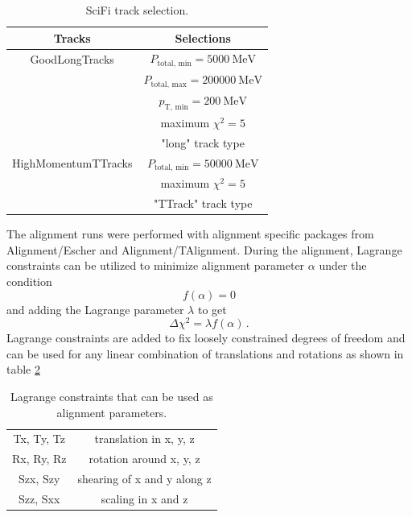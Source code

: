 \begin{table}[!ht]
    \centering
    \begin{tabular}{c|c}
        \toprule
            Tracks & Selections \\
        \midrule
            GoodLongTracks &  $P_{\text{total, min}} = \SI{5000}{\mega\electronvolt}$ \\
            & $P_{\text{total, max}} = \SI{200000}{\mega\electronvolt}$ \\
            & $p_\text{T, min} = \SI{200}{\mega\electronvolt}$ \\
            & maximum $\chi^2 = 5$ \\
            & "long" track type \\
            \hline
            HighMomentumTTracks & $P_{\text{total, min}} = \SI{50000}{\mega\electronvolt}$ \\
            & maximum $\chi^2 = 5$ \\
            & "TTrack" track type \\
        \bottomrule
    \end{tabular}
    \caption{SciFi track selection.}
    \label{tab:tracks}
\end{table}

The alignment runs were performed with alignment specific packages from Alignment/Escher and Alignment/TAlignment\cite{align}.
During the alignment, Lagrange constraints can be utilized to minimize alignment
parameter $\alpha $ under the condition
\begin{equation}
  f(\alpha) = 0
\end{equation}
and adding the Lagrange parameter $\lambda$ to get
\begin{equation}
  \Delta \chi^2 = \lambda f(\alpha)\,.
\end{equation}
Lagrange constraints are added to fix loosely constrained degrees of freedom and can be used for any linear combination of translations and rotations as shown in table \ref{tab:lagr}

\begin{table}[!ht]
    \centering
    \begin{tabular}{c|c}
        \toprule
            Tx, Ty, Tz & translation in x, y, z \\
            Rx, Ry, Rz & rotation around x, y, z \\
            Szx, Szy & shearing of x and y along z \\
            Szz, Sxx & scaling in x and z \\
        \bottomrule
    \end{tabular}
    \caption{Lagrange constraints that can be used as alignment parameters.}
    \label{tab:lagr}
\end{table}

